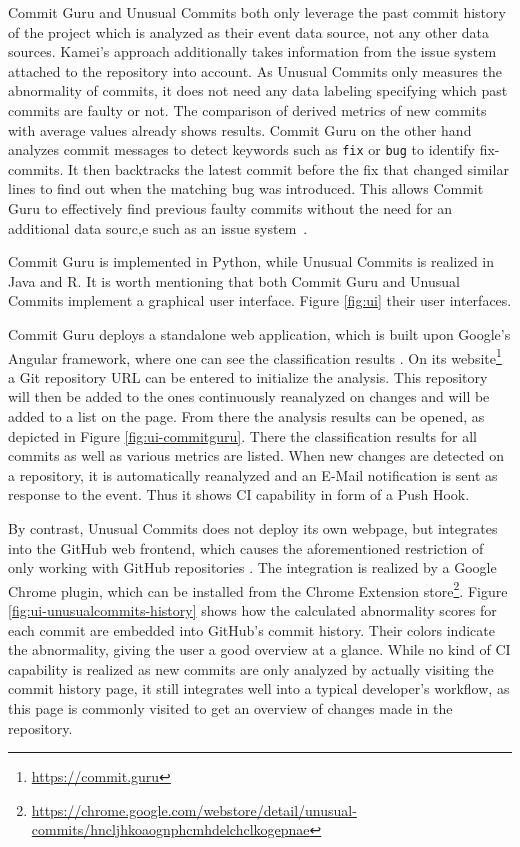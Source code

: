 Commit Guru and Unusual Commits both only leverage the past commit history of the project which is analyzed as their event data source, not any other data sources. Kamei's approach additionally takes information from the issue system attached to the repository into account.
As Unusual Commits only measures the abnormality of commits, it does not need any data labeling specifying which past commits are faulty or not. The comparison of derived metrics of new commits with average values already shows results.
Commit Guru on the other hand analyzes commit messages to detect keywords such as \texttt{fix} or \texttt{bug} to identify fix-commits. It then backtracks the latest commit before the fix that changed similar lines to find out when the matching bug was introduced. 
This allows Commit Guru to effectively find previous faulty commits without the need for an additional data sourc,e such as an issue system~\cite{Rosen2015}.

Commit Guru is implemented in Python, while Unusual Commits is realized in Java and R. It is worth mentioning that both Commit Guru and Unusual Commits implement a graphical user interface. 
Figure \ref{fig:ui} their user interfaces. 

Commit Guru deploys a standalone web application, which is built upon Google's Angular framework, where one can see the classification results \cite{Rosen2015}. On its website\footnote{\url{https://commit.guru}} a Git repository URL can be entered to initialize the analysis. This repository will then be added to the ones continuously reanalyzed on changes and will be added to a list on the page. From there the analysis results can be opened, as depicted in Figure \ref{fig:ui-commitguru}. There the classification results for all commits as well as various metrics are listed. When new changes are detected on a repository, it is automatically reanalyzed and an E-Mail notification is sent as response to the event. Thus it shows CI capability in form of a Push Hook.

By contrast, Unusual Commits does not deploy its own webpage, but integrates into the GitHub web frontend, which causes the aforementioned restriction of only working with GitHub repositories \cite{Goyal2017}. The integration is realized by a Google Chrome plugin, which can be installed from the Chrome Extension store\footnote{\url{https://chrome.google.com/webstore/detail/unusual-commits/hncljhkoaognphcmhdelchclkogepnae}}. Figure \ref{fig:ui-unusualcommits-history} shows how the calculated abnormality scores for each commit are embedded into GitHub's commit history. Their colors indicate the abnormality, giving the user a good overview at a glance. While no kind of CI capability is realized as new commits are only analyzed by actually visiting the commit history page, it still integrates well into a typical developer's workflow, as this page is commonly visited to get an overview of changes made in the repository. 

